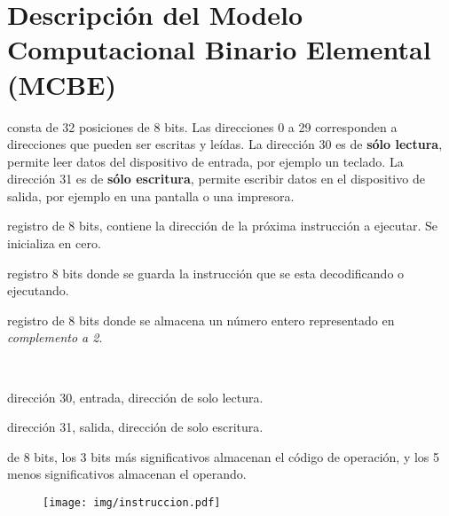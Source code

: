 \documentclass[12pt]{article}
\begin{document}
\section*{Descripción del Modelo Computacional Binario Elemental (MCBE)}

\begin{description}
    \itemsep2pt \parskip0pt 

    \item[Memoria:] consta de 32 posiciones de 8 bits. Las direcciones 0 a 29
        corresponden a direcciones que pueden ser escritas y leídas. La
        dirección 30 es de \textbf{sólo lectura}, permite leer datos del
        dispositivo de entrada, por ejemplo un teclado. La dirección 31 es de
        \textbf{sólo escritura}, permite escribir datos en el dispositivo de
        salida, por ejemplo en una pantalla o una impresora.

    \item[Registro PC:] registro de 8 bits, contiene la dirección de la
        próxima instrucción a ejecutar. Se inicializa en cero.

    \item[Registro IR:] registro 8 bits donde se guarda la instrucción que se
        esta decodificando o ejecutando.

    \item[Registro acumulador:] registro de 8 bits donde se almacena un
        número entero representado en \emph{complemento a 2}.

    \item[Etiquetas predefinidas:]~

        \begin{description}
            \itemsep2pt \parskip0pt 

            \item[IN:] dirección 30, entrada, dirección de solo lectura.

            \item[OUT:] dirección 31, salida, dirección de solo escritura.

        \end{description}

    \item[Instrucciones:] de 8 bits, los 3 bits más significativos almacenan
        el código de operación, y los 5 menos significativos almacenan el
        operando.

        \begin{figure}[h]
            \centering
            \texttt{[image: img/instruccion.pdf]}
        \end{figure}

\end{description}
\end{document}
